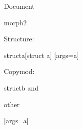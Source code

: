 \documentclass[debug=all]{stex}
\begin{document}
\noindent Document \printdocument

\begin{smodule}{morph2}

  Structure:
  \begin{mathstructure}{structa}[struct a]
    [args=a]{}
  \end{mathstructure}

  Copymod:
  \begin{mathstructure}{structb}
     and 
  \end{mathstructure}

\end{smodule}

\begin{smodule}{other}

  [args=a]{}

\end{smodule}
\end{document}
